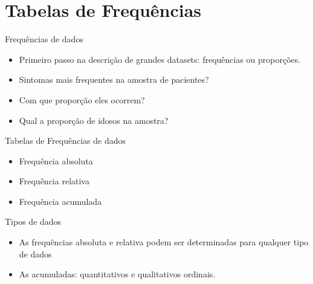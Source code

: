 \documentclass{beamer}
\begin{document}
\section{Tabelas de Frequências}

\begin{frame}{Frequências de dados}
  \begin{itemize}
  \item Primeiro passo na descrição de grandes datasets: \alert{frequências ou proporções}.
  \end{itemize}
  \begin{example}
    \begin{itemize}
    \item Sintomas mais frequentes na amostra de pacientes?
    \item Com que proporção eles ocorrem?
    \end{itemize}
  \end{example}
  \begin{example}
    \begin{itemize}
    \item Qual a proporção de idosos na amostra?
    \end{itemize}
  \end{example}
\end{frame}

\begin{frame}{Tabelas de Frequências de dados}
  \begin{itemize}
  \item Frequência absoluta
  \item Frequência relativa
  \item Frequência acumulada
  \end{itemize}
  \begin{block}{Tipos de dados}
    \begin{itemize}
    \item As frequências absoluta e relativa podem ser determinadas para qualquer tipo de dados
    \item As acumuladas: quantitativos e qualitativos ordinais.
    \end{itemize}
  \end{block}
\end{frame}
\end{document}
